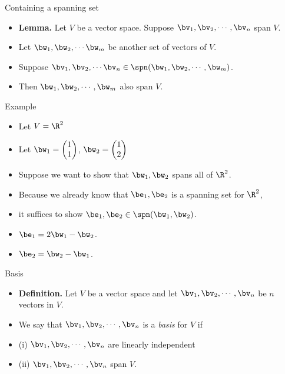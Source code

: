 \documentclass{beamer}
\begin{document}
\begin{frame}{Containing a spanning set}

\begin{itemize}
\item \textbf{Lemma.} Let $V$ be a vector space. Suppose $\bv_1,\bv_2,\cdots,\bv_n$ span $V$.
\item Let $\bw_1,\bw_2,\cdots\bw_m$ be another set of vectors of $V$.
\item Suppose $\bv_1,\bv_2,\cdots\bv_n\in\spn(\bw_1,\bw_2,\cdots,\bw_m)$.
\item Then $\bw_1,\bw_2,\cdots,\bw_m$ also span $V$.
\end{itemize}

\end{frame}

\begin{frame}{Example}

\begin{itemize}
\item Let $V=\R^2$
\item Let $\bw_1 =
\begin{pmatrix}
1 \\ 1
\end{pmatrix}
$, $\bw_2 =
\begin{pmatrix}
1 \\ 2
\end{pmatrix}
$
\item Suppose we want to show that $\bw_1,\bw_2$ spans all of $\R^2$.
\item Because we already know that $\be_1,\be_2$ is a spanning set for $\R^2$,
\item it suffices to show $\be_1,\be_2\in\spn(\bw_1,\bw_2)$.
\item $\be_1 = 2\bw_1 - \bw_2$.
\item $\be_2 = \bw_2 - \bw_1$.

\end{itemize}

\end{frame}


\begin{frame}{Basis}

\begin{itemize}
\item \textbf{Definition.} Let $V$ be a vector space and let $\bv_1,\bv_2,\cdots,\bv_n$ be $n$ vectors in $V$.
\item We say that $\bv_1,\bv_2,\cdots,\bv_n$ is a \emph{basis} for $V$ if
\item (i) $\bv_1,\bv_2,\cdots,\bv_n$ are linearly independent
\item (ii) $\bv_1,\bv_2,\cdots,\bv_n$ span $V$.
\end{itemize}
\end{frame}
\end{document}
